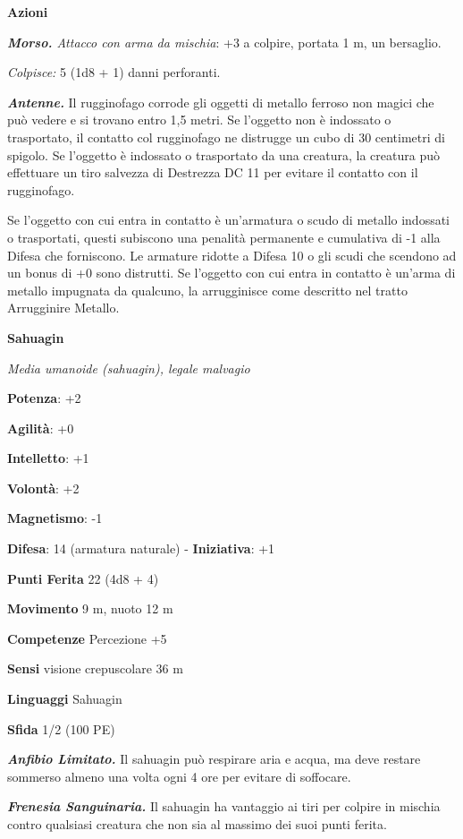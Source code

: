 \begin{multicols}{2}
\smallskip\textbf{Azioni}

\emph{\textbf{Morso.} Attacco con arma da mischia}: +3 a colpire,
portata 1 m, un bersaglio.

\emph{Colpisce:} 5 (1d8 + 1) danni perforanti.

\emph{\textbf{Antenne.}} Il rugginofago corrode gli oggetti di metallo
ferroso non magici che può vedere e si trovano entro 1,5 metri. Se
l'oggetto non è indossato o trasportato, il contatto col rugginofago ne
distrugge un cubo di 30 centimetri di spigolo. Se l'oggetto è indossato
o trasportato da una creatura, la creatura può effettuare un tiro
salvezza di Destrezza DC 11 per evitare il contatto con il rugginofago.

Se l'oggetto con cui entra in contatto è un'armatura o scudo di metallo
indossati o trasportati, questi subiscono una penalità permanente e
cumulativa di -1 alla Difesa che forniscono. Le armature ridotte a Difesa 10 o
gli scudi che scendono ad un bonus di +0 sono distrutti. Se l'oggetto
con cui entra in contatto è un'arma di metallo impugnata da qualcuno, la
arrugginisce come descritto nel tratto Arrugginire Metallo.

\textbf{Sahuagin}

\emph{Media umanoide (sahuagin), legale malvagio}

\textbf{Potenza}: +2

\textbf{Agilità}: +0

\textbf{Intelletto}: +1

\textbf{Volontà}: +2

\textbf{Magnetismo}: -1

\textbf{Difesa}: 14 (armatura naturale) - \textbf{Iniziativa}: +1

\textbf{Punti Ferita} 22 (4d8 + 4)

\textbf{Movimento} 9 m, nuoto 12 m

\textbf{Competenze} Percezione +5

\textbf{Sensi} visione crepuscolare 36 m

\textbf{Linguaggi} Sahuagin

\textbf{Sfida} 1/2 (100 PE)\smallskip

\emph{\textbf{Anfibio Limitato.}} Il sahuagin può respirare aria e
acqua, ma deve restare sommerso almeno una volta ogni 4 ore per evitare
di soffocare.

\emph{\textbf{Frenesia Sanguinaria.}} Il sahuagin ha vantaggio ai tiri
per colpire in mischia contro qualsiasi creatura che non sia al massimo
dei suoi punti ferita.


\end{multicols}

